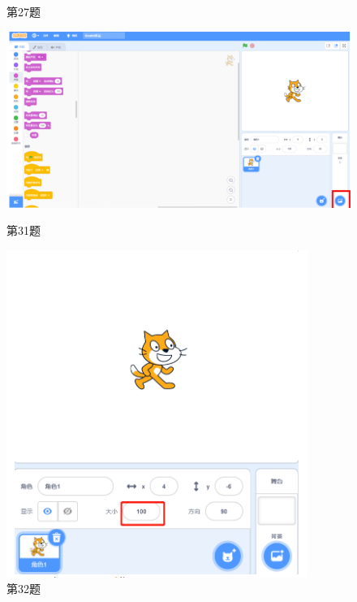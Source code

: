 \documentclass[10pt, a4paper]{article}
\begin{document}
\begin{enumerate}
\begin{figure}[htbp]
\begin{minipage}[t]{.23\textwidth}
\begin{minipage}[t]{.45\textwidth}
                \end{minipage}
                \caption*{第27题}
            \end{minipage}
            \begin{minipage}[t]{.3\textwidth}
                \centering
                \includegraphics[width=\textwidth]{31.png}
                \caption*{第31题}
            \end{minipage}
            \begin{minipage}[t]{.25\textwidth}
                \centering
                \includegraphics[width=\textwidth]{32.png}
                \caption*{第32题}

\end{minipage}
\end{figure}
\end{enumerate}
\end{document}
